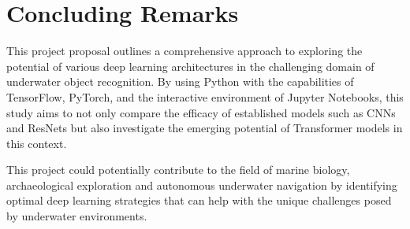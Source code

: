 \section{Concluding Remarks}

This project proposal outlines a comprehensive approach to exploring the
potential of various deep learning architectures in the challenging domain of
underwater object recognition.
By using Python with the capabilities of TensorFlow, PyTorch,
and the interactive environment of Jupyter Notebooks, this study aims to not
only compare the efficacy of established models such as CNNs and ResNets but
also investigate the emerging potential of Transformer models in this context.

This project could potentially contribute to the field of marine biology,
archaeological exploration and autonomous underwater navigation by identifying
optimal deep learning strategies that can help with the unique challenges
posed by underwater environments.